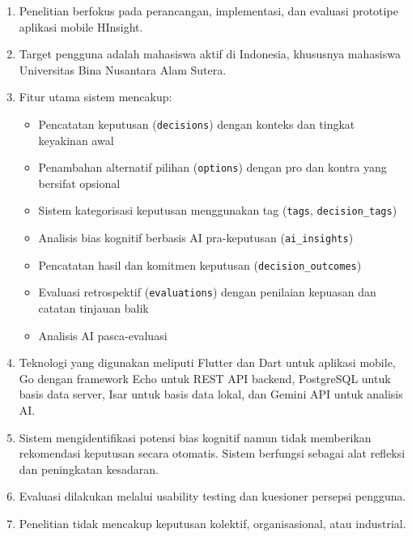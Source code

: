\documentclass[11pt]{article}
\begin{document}
\begin{enumerate}
  \item Penelitian berfokus pada perancangan, implementasi, dan evaluasi prototipe aplikasi mobile HInsight.
  \item Target pengguna adalah mahasiswa aktif di Indonesia, khususnya mahasiswa Universitas Bina Nusantara Alam Sutera.
  \item Fitur utama sistem mencakup:
  \begin{itemize}
    \item Pencatatan keputusan (\texttt{decisions}) dengan konteks dan tingkat keyakinan awal
    \item Penambahan alternatif pilihan (\texttt{options}) dengan pro dan kontra yang bersifat opsional
    \item Sistem kategorisasi keputusan menggunakan tag (\texttt{tags}, \texttt{decision\_tags})
    \item Analisis bias kognitif berbasis AI pra-keputusan (\texttt{ai\_insights})
    \item Pencatatan hasil dan komitmen keputusan (\texttt{decision\_outcomes})
    \item Evaluasi retrospektif (\texttt{evaluations}) dengan penilaian kepuasan dan catatan tinjauan balik
    \item Analisis AI pasca-evaluasi
  \end{itemize}
  \item Teknologi yang digunakan meliputi Flutter dan Dart untuk aplikasi mobile, Go dengan framework Echo untuk REST API backend, PostgreSQL untuk basis data server, Isar untuk basis data lokal, dan Gemini API untuk analisis AI.
  \item Sistem mengidentifikasi potensi bias kognitif namun tidak memberikan rekomendasi keputusan secara otomatis. Sistem berfungsi sebagai alat refleksi dan peningkatan kesadaran.
  \item Evaluasi dilakukan melalui usability testing dan kuesioner persepsi pengguna.
  \item Penelitian tidak mencakup keputusan kolektif, organisasional, atau industrial.
\end{enumerate}
 
\end{document}
